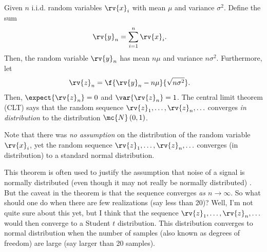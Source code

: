\begin{theoremBox}
   Given $n$ i.i.d. random variables $\rv{x}_{i}$ with mean $\mu$ and variance $\sigma^{2}$. Define the sum
   \begin{align}
       \rv{y}_{n} &= \sum_{i=1}^{n}\rv{x}_{i}.
   \end{align}
   Then, the random variable $\rv{y}_{n}$ has mean $n\mu$ and variance $n\sigma^{2}$. Furthermore, let
   \begin{align}
       \rv{z}_{n} &= \f{\rv{y}_{n} - n\mu}{\sqrt{n\sigma^{2}}}.
   \end{align}
   Then, $\expect{\rv{z}_{n}} = 0$ and $\var{\rv{z}_{n}} = 1$. The central limit theorem (CLT) says that the random sequence $\rv{z}_{1},\ldots, \rv{z}_{n}, \ldots$ converges \emph{in distribution} to the distribution $\mc{N}\left( 0,1 \right)$. 
\end{theoremBox}
\begin{remarkBox}
    Note that there was \emph{no assumption} on the distribution of the random variable $\rv{x}_{i}$, yet the random sequence $\rv{z}_{1},\ldots, \rv{z}_{n},\ldots$ converges (in distribution) to a standard normal distribution.

    This theorem is often used to justify the assumption that noise of a signal is normally distributed (even though it may not really be normally distributed) \cite{li_evaluation_2012}. But the caveat in the theorem is that the sequence converges \emph{as $n\to\infty$}. So what should one do when there are few realizations (say less than 20)? Well, I'm not quite sure about this yet, but I think that the sequence $\rv{z}_{1}, \ldots, \rv{z}_{n}, \ldots$ would then converge to a Student $t$ distribution. This distribution converges to normal distribution when the number of samples (also known as degrees of freedom) are large (say larger than 20 samples).
\end{remarkBox}
